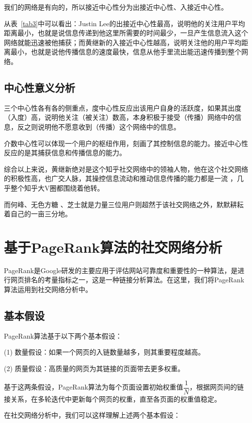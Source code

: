 \documentclass[a4paper]{article}
\begin{document}
\begin{spacing}{1.5}
我们的网络是有向的，所以接近中心性分为出接近中心性、入接近中心性。

从表~\ref{tab3}中可以看出：Justin Lee的出接近中心性最高，说明他的关注用户平均距离最小，也就是说信息传递到他这里所需要的时间最少，一旦产生信息流入这个网络就能迅速被他捕获；而黄继新的入接近中心性越高，说明关注他的用户平均距离最小，也就是说他传播信息的速度最快，信息从他手里流出能迅速传播到整个网络。


\subsection{中心性意义分析}
三个中心性各有各的侧重点，度中心性反应出该用户自身的活跃度，如果其出度（入度）高，说明他关注（被关注）数高，本身积极于接受（传播）网络中的信息，反之则说明他不愿意收到（传播）这个网络中的信息。

介数中心性可以体现一个用户的枢纽作用，刻画了其控制信息的能力。接近中心性反应的是其捕获信息和传播信息的能力。

综合以上来说，黄继新绝对是这个知乎社交网络中的领袖人物，他在这个社交网络的积极性高，也广交人脉，其操控信息流动和推动信息传播的能力都是一流 ，几乎整个知乎大V圈都围绕着他转。

而何峰、无色方糖 、芝士就是力量三位用户则超然于该社交网络之外，默默耕耘着自己的一亩三分地。



\section{基于PageRank算法的社交网络分析}\label{sec5}
PageRank是Google研发的主要应用于评估网站可靠度和重要性的一种算法，是进行网页排名的考量指标之一，这是一种链接分析算法。在这里，我们将PageRank算法运用到社交网络分析中。


\subsection{基本假设}

PageRank算法基于以下两个基本假设：

(1) 数量假设：如果一个网页的入链数量越多，则其重要程度越高。

(2) 质量假设：高质量的网页为其链接的页面带去更多权重。


基于这两条假设，PageRank算法为每个页面设置初始权重值$\dfrac{1}{N}$，根据网页间的链接关系，在多轮迭代中更新每个网页的权重，直至各页面的权重值稳定。

在社交网络分析中，我们可以这样理解上述两个基本假设：


\end{spacing}
\end{document}
